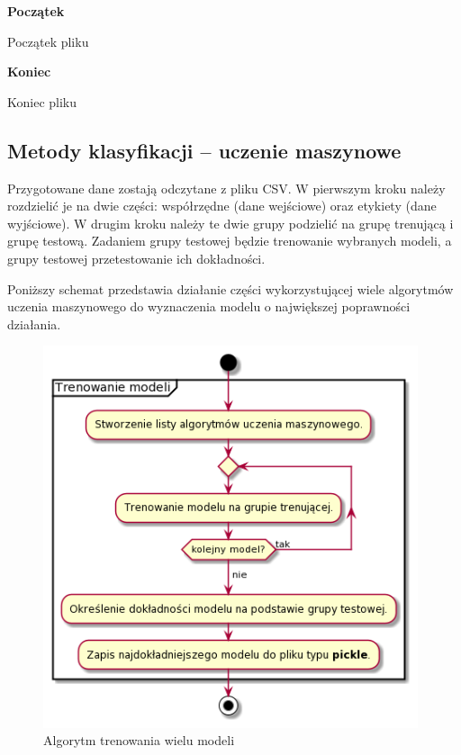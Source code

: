 \textbf{Początek}\newline

\begin{table}[H]
\centering
{} 
\caption{Początek pliku}
\end{table}

\textbf{Koniec}\newline

\begin{table}[H]
\centering
{} 
\caption{Koniec pliku}
\end{table}

\newpage
\subsection{Metody klasyfikacji -- uczenie maszynowe}

\quad Przygotowane dane zostają odczytane z pliku CSV. W pierwszym kroku należy rozdzielić je na dwie części: współrzędne (dane wejściowe) oraz etykiety (dane wyjściowe). W drugim kroku należy te dwie grupy podzielić na grupę trenującą i grupę testową. Zadaniem grupy testowej będzie trenowanie wybranych modeli, a grupy testowej przetestowanie ich dokładności. 

\quad Poniższy schemat przedstawia działanie części wykorzystującej wiele algorytmów uczenia maszynowego do wyznaczenia modelu o największej poprawności działania. 

\begin{figure}[H]
    \begin{center}
        \includegraphics[width=11cm]{../images/train_models.png}
        \caption{Algorytm trenowania wielu modeli}
    \end{center}
\end{figure}

